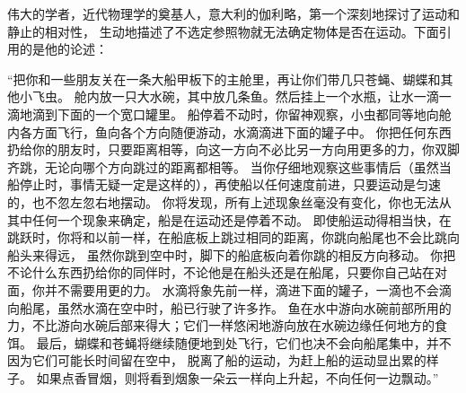 伟大的学者，近代物理学的奠基人，意大利的伽利略，第一个深刻地探讨了运动和静止的相对性，
生动地描述了不选定参照物就无法确定物体是否在运动。下面引用的是他的论述：

“把你和一些朋友关在一条大船甲板下的主舱里，再让你们带几只苍蝇、蝴蝶和其他小飞虫。
舱内放一只大水碗，其中放几条鱼。然后挂上一个水瓶，让水一滴一滴地滴到下面的一个宽口罐里。
船停着不动时，你留神观察，小虫都同等地向舱内各方面飞行，鱼向各个方向随便游动，水滴滴进下面的罐子中。
你把任何东西扔给你的朋友时，只要距离相等，向这一方向不必比另一方向用更多的力，你双脚齐跳，无论向哪个方向跳过的距离都相等。
当你仔细地观察这些事情后（虽然当船停止时，事情无疑一定是这样的），再使船以任何速度前进，只要运动是匀速的，也不忽左忽右地摆动。
你将发现，所有上述现象丝毫没有变化，你也无法从其中任何一个现象来确定，船是在运动还是停着不动。
即使船运动得相当快，在跳跃时，你将和以前一样，在船底板上跳过相同的距离，你跳向船尾也不会比跳向船头来得远，
虽然你跳到空中时，脚下的船底板向着你跳的相反方向移动。
你把不论什么东西扔给你的同伴时，不论他是在船头还是在船尾，只要你自己站在对面，你并不需要用更的力。
水滴将象先前一样，滴进下面的罐子，一滴也不会滴向船尾，虽然水滴在空中时，船已行驶了许多拃。
鱼在水中游向水碗前部所用的力，不比游向水碗后部来得大；它们一样悠闲地游向放在水碗边缘任何地方的食饵。
最后，蝴蝶和苍蝇将继续随便地到处飞行，它们也决不会向船尾集中，并不因为它们可能长时间留在空中，
脱离了船的运动，为赶上船的运动显出累的样子。
如果点香冒烟，则将看到烟象一朵云一样向上升起，不向任何一边飘动。”

